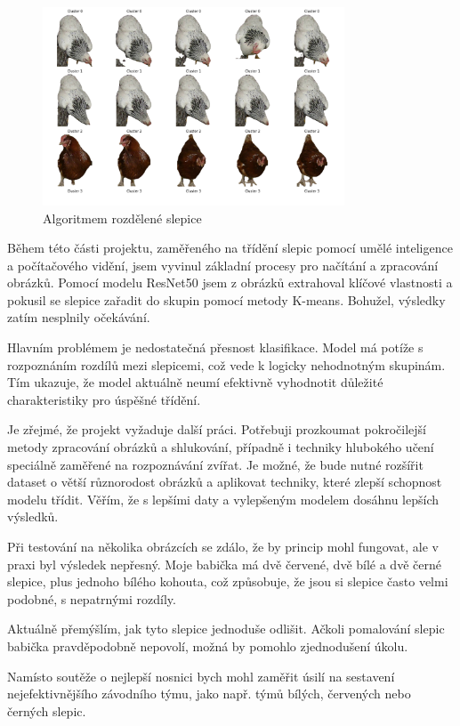 \begin{figure}[H]
    \centering
    \includegraphics[width=0.8\textwidth]{img/chicks_in_clusters_2}
    \caption{Algoritmem rozdělené slepice}
    \label{fig:chicks_in_clusters_2}
\end{figure}

Během této části projektu, zaměřeného na třídění slepic pomocí umělé inteligence a počítačového vidění, jsem vyvinul základní procesy pro načítání a zpracování obrázků.
Pomocí modelu ResNet50 jsem z obrázků extrahoval klíčové vlastnosti a pokusil se slepice zařadit do skupin pomocí metody K-means.
Bohužel, výsledky zatím nesplnily očekávání.

Hlavním problémem je nedostatečná přesnost klasifikace.
Model má potíže s rozpoznáním rozdílů mezi slepicemi, což vede k logicky nehodnotným skupinám.
Tím ukazuje, že model aktuálně neumí efektivně vyhodnotit důležité charakteristiky pro úspěšné třídění.

Je zřejmé, že projekt vyžaduje další práci.
Potřebuji prozkoumat pokročilejší metody zpracování obrázků a shlukování, případně i techniky hlubokého učení speciálně zaměřené na rozpoznávání zvířat.
Je možné, že bude nutné rozšířit dataset o větší různorodost obrázků a aplikovat techniky, které zlepší schopnost modelu třídit.
Věřím, že s lepšími daty a vylepšeným modelem dosáhnu lepších výsledků.

Při testování na několika obrázcích se zdálo, že by princip mohl fungovat, ale v praxi byl výsledek nepřesný.
Moje babička má dvě červené, dvě bílé a dvě černé slepice, plus jednoho bílého kohouta, což způsobuje, že jsou si slepice často velmi podobné, s nepatrnými rozdíly.

Aktuálně přemýšlím, jak tyto slepice jednoduše odlišit.
Ačkoli pomalování slepic babička pravděpodobně nepovolí, možná by pomohlo zjednodušení úkolu.

Namísto soutěže o nejlepší nosnici bych mohl zaměřit úsilí na sestavení nejefektivnějšího závodního týmu, jako např. týmů bílých, červených nebo černých slepic.






